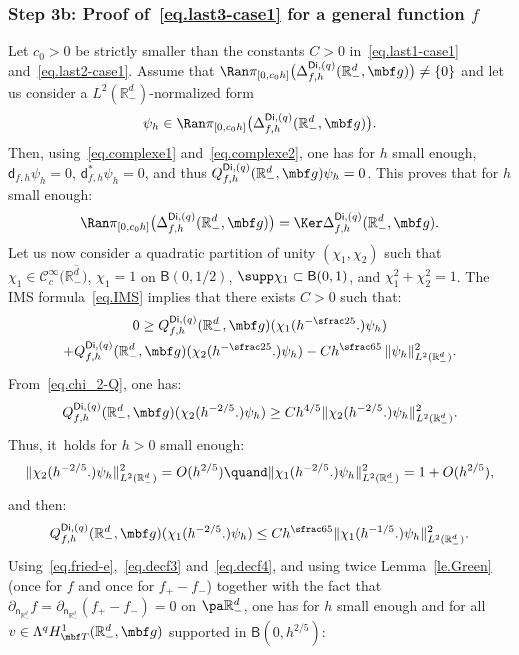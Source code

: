 \subsubsection*{Step 3b: Proof of~\eqref{eq.last3-case1} for a general
function $f$}
Let $c_0>0$ be strictly smaller than the constants $C>0$ in~\eqref{eq.last1-case1} and~\eqref{eq.last2-case1}.
Assume that $\Ran \pi _{[0,c_0h]}\bigl(\Delta_{f,h}^{\mathsf{Di},(q)}(\mathbb R_-^d, \mbf g) \bigr) \neq \{0\}$ and let us consider a $L^2(\mathbb R_-^d) $-normalized form
\[
\psi_h\in \Ran \pi _{[0,c_0h]}\bigl(\Delta_{f,h}^{\mathsf{Di},(q)}(\mathbb R_-^d, \mbf g) \bigr).
\]
Then, using~\eqref{eq.complexe1} and~\eqref{eq.complexe2}, one has for $h$ small enough,
$\mathsf d_{f,h}\psi_h= 0$, $\mathsf d_{f,h}^*\psi_h=0$, and thus $Q_{f,h}^{\mathsf{Di},(q)}(\mathbb R_-^d, \mbf g) \psi_h=0$.
This proves that for $h$ small enough:
\[
\Ran \pi_{[0,c_0h]}\bigl(\Delta_{f,h}^{\mathsf{Di},(q)}(\mathbb R_-^d, {\mbf g})\bigr)=\Ker \Delta_{f,h}^{\mathsf{Di},(q)}(\mathbb R_-^d, {\mbf g}).
\]
Let us now consider a quadratic partition of unity $(\chi_1,\chi_2)$ such that $\chi_1\in\mathcal C_c^\infty (\overline {\mathbb R_-^d)}$, $\chi_1=1$ on $\mathsf B(0,1/2)$, $\supp \chi_1\subset \mathsf B(0,1)$, and $\chi_1^2+\chi_2^2=1$.
The IMS formula~\eqref{eq.IMS}
implies that there exists $C>0$ such that:
\begin{multline}
\label{eq.ast1}
0\ge Q_{f,h}^{\mathsf{Di},(q)}(\mathbb R_-^d, \mbf g)
(\chi_1(h^{-\sfrac 25}.) \psi_h)\\
+Q_{f,h}^{\mathsf{Di},(q)}(\mathbb R^d_-, \mbf g)(\chi_2(h^{-\sfrac 25}.) \psi_h) -C h^{\sfrac 65}\, \Vert \psi_h \Vert_{L^2(\mathbb R_-^d)}^2.
\end{multline}
From~\eqref{eq.chi_2-Q}, one has:
\[
Q_{f,h}^{\mathsf{Di},(q)}(\mathbb R^d_-, \mbf g)(\chi_2(h^{-2/5 }.) \psi_h)\ge Ch^{4/5} \Vert \chi_2(h^{-2/5 }.) \psi_h \Vert_{L^2(\mathbb R_-^d)}^2.
\]
Thus, it~holds for $h>0$ small enough:
\begin{equation}\label{norme-chi}
\Vert \chi_2(h^{-2/5 }.) \psi_h \Vert_{L^2(\mathbb R_-^d)}^2 =O(h^{2/5 }) \quand \Vert \chi_1(h^{-2/5 }.) \psi_h \Vert_{L^2(\mathbb R_-^d)}^2=1+O (h^{2/5 }),
\end{equation}
and then:
\begin{equation}\label{quad-chi1}
Q_{f,h}^{\mathsf{Di},(q)}(\mathbb R^d_-, { \mbf g}) (\chi_1(h^{-2/5 }.) \psi_h)\le Ch^{\sfrac 65} \Vert \chi_1(h^{-1/5 }.) \psi_h \Vert_{L^2(\mathbb R_-^d)}^2.
\end{equation}
Using~\eqref{eq.fried-e},~\eqref{eq.decf3} and~\eqref{eq.decf4}, and using twice Lemma~\ref{le.Green} (once for $f$ and once for $f_+-f_-$) together with the fact that $ \partial_{\mathsf n_{\mathbb R^d_-}}f= \partial_{\mathsf n_{\mathbb R^d_-}}(f_+-f_-)=0$ on $\pa \mathbb R^d_-$, one has for $h$ small enough and for all $v\in \Lambda^qH^1_{\mbf T}(\mathbb R^d_-, \mbf g) $ supported in $\mathsf B(0,h^{2/5})$:

